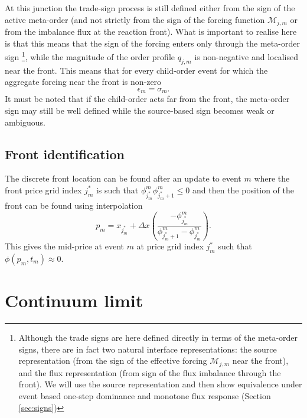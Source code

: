 \documentclass[5p,final]{elsarticle}
\begin{document}
At this junction the trade-sign process is still defined either from the sign of the active meta-order (and not strictly from the sign of the forcing function $\mathcal M_{j,m}$ or from the imbalance flux at the reaction front). What is important to realise here is that this means that the sign of the forcing enters only through  the meta-order sign \footnote{Although the trade signs are here defined directly in terms of the meta-order signs, there are in fact two natural interface representations: the source representation (from the sign of the effective forcing $\mathcal M_{j,m}$ near the front), and the flux representation (from sign of the flux imbalance through the front). We will use the source representation and then show equivalence under event based one-step dominance and monotone flux response (Section \ref{sec:signs})}, while the magnitude of the order profile $q_{j,m}$ is non-negative and localised near the front. This means that for every child-order event for which the aggregate forcing near the front is non-zero
\begin{equation}
    \epsilon_m = \sigma_m.
\end{equation}
It must be noted that if the child-order acts far from the front, the meta-order sign may still be well defined while the source-based sign becomes weak or ambiguous. 

\subsection{Front identification}
\label{sec:front}
The discrete front location can be found after an update to event $m$ where the front price grid index $j_m^*$ is such that $\phi^m_{j_m^*} \phi^m_{j_m^*+1} \le 0$ and then the position of the front can be found using interpolation
\begin{equation}
    p_m = x_{j_m^*} + \Delta x \left( {\frac{-\phi_{j_m^*}^m}{\phi_{j_m^*+1}^m-\phi_{j_m^*}^m}} \right).
\end{equation}
This gives the mid-price at event $m$ at price grid index $j_m^*$ such that $\phi(p_m,t_m)\approx 0$.

\section{Continuum limit}
\label{sec:continuum}
\end{document}
